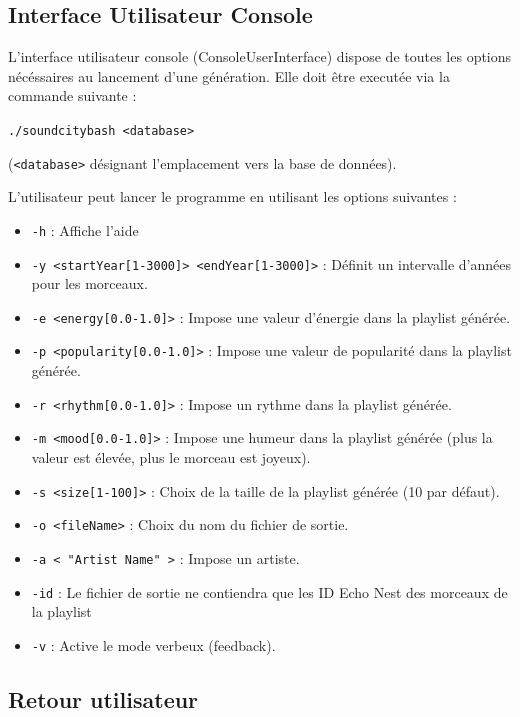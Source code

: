 \subsection{Interface Utilisateur Console}
\label{archi:interface:console}

L'interface utilisateur console (ConsoleUserInterface) dispose de toutes les options 
nécéssaires au lancement d'une génération. 
Elle doit être executée via la commande suivante :

\texttt{./soundcitybash <database>}

(\texttt{<database>} désignant l'emplacement vers la base de données).

\vspace{3mm}
\noindent L'utilisateur peut lancer le programme en utilisant les options suivantes :
\begin{itemize}
\item \texttt{-h} : Affiche l'aide
\item \texttt{-y <startYear[1-3000]> <endYear[1-3000]>} : Définit un intervalle 
d'années pour les morceaux.
\item \texttt{-e <energy[0.0-1.0]>} : Impose une valeur d'énergie dans 
la playlist générée.
\item \texttt{-p <popularity[0.0-1.0]>} : Impose une valeur de popularité 
dans la playlist générée.
\item \texttt{-r <rhythm[0.0-1.0]>} : Impose un rythme dans la 
playlist générée.
\item \texttt{-m <mood[0.0-1.0]>} : Impose une humeur dans la 
playlist générée (plus la valeur est élevée, plus le morceau est joyeux).
\item \texttt{-s <size[1-100]>} : Choix de la taille de la 
playlist générée (10 par défaut).
\item \texttt{-o <fileName>} : Choix du nom du fichier de sortie.
\item \texttt{-a < "Artist Name" >} : Impose un artiste.
\item \texttt{-id} : Le fichier de sortie ne contiendra que les ID Echo Nest 
des morceaux de la playlist
\item \texttt{-v} : Active le mode verbeux (feedback).
\end{itemize}

\subsection{Retour utilisateur}
\label{archi:interface:feedback}

